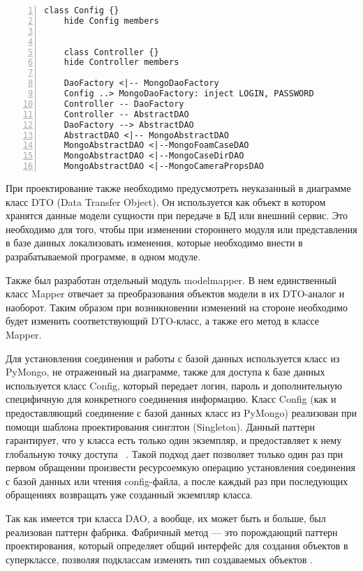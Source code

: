 \documentclass[14pt]{extreport}
\begin{document}
\begin{enumerate}[label=\Roman*.]
	\begin{Verbatim}[numbers=left,xleftmargin=5mm,fontsize=\small]
	class Config {}
	hide Config members
	
	
	class Controller {}
	hide Controller members
	
	DaoFactory <|-- MongoDaoFactory
	Config ..> MongoDaoFactory: inject LOGIN, PASSWORD
	Controller -- DaoFactory
	Controller -- AbstractDAO
	DaoFactory --> AbstractDAO
	AbstractDAO <|-- MongoAbstractDAO
	MongoAbstractDAO <|--MongoFoamCaseDAO
	MongoAbstractDAO <|--MongoCaseDirDAO
	MongoAbstractDAO <|--MongoCameraPropsDAO
	\end{Verbatim}
	
	
\end{enumerate}

При проектирование также необходимо предусмотреть неуказанный в диаграмме класс DTO (Data Transfer Object). Он используется как объект в котором хранятся данные модели сущности при передаче в БД или внешний сервис. Это необходимо для того, чтобы при изменении стороннего модуля или представления в базе данных локализовать изменения, которые необходимо внести в разрабатываемой программе, в одном модуле.

Также был разработан отдельный модуль modelmapper. В нем единственный класс Mapper отвечает за преобразования объектов модели в их DTO-аналог и наоборот. Таким образом при возникновении изменений на стороне необходимо будет изменить соответствующий DTO-класс, а также его метод в классе Mapper. 

Для установления соединения и работы с базой данных используется класс из PyMongo, не отраженный на диаграмме, также для доступа к базе данных используется класс Config, который передает логин, пароль и дополнительную специфичную для конкретного соединения информацию. Класс Config (как и предоставляющий соединение с базой данных класс из PyMongo) реализован при помощи шаблона проектирования синглтон (Singleton). Данный паттерн гарантирует, что у класса есть только один экземпляр, и предоставляет к нему глобальную точку доступа ~\cite{oop}. Такой подход дает позволяет только один раз при первом обращении произвести ресурсоемкую операцию установления соединения с базой данных или чтения config-файла, а после каждый раз при последующих обращениях возвращать уже созданный экземпляр класса. 

Так как имеется три класса DAO, а вообще, их может быть и больше, был реализован паттерн фабрика. Фабричный метод — это порождающий паттерн проектирования, который определяет общий интерфейс для создания объектов в суперклассе, позволяя подклассам изменять тип создаваемых объектов \cite{pattern-factory}.
\end{document}
